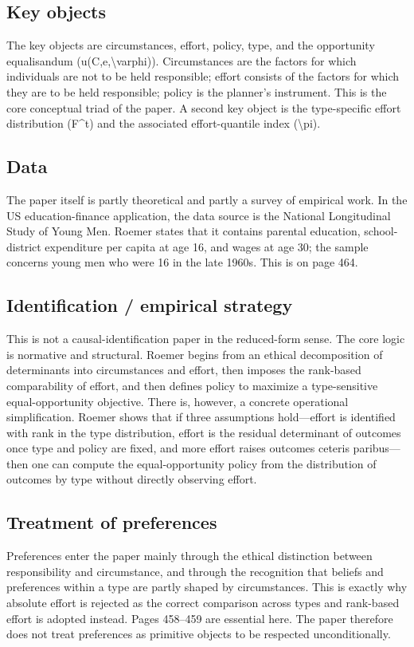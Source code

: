 \documentclass[11pt,a4paper]{article}
\begin{document}
\subsection*{Key objects}
The key objects are circumstances, effort, policy, type, and the opportunity equalisandum (u(C,e,\textbackslash{}varphi)). Circumstances are the factors for which individuals are not to be held responsible; effort consists of the factors for which they are to be held responsible; policy is the planner’s instrument. This is the core conceptual triad of the paper. A second key object is the type-specific effort distribution (F\textasciicircum{}t) and the associated effort-quantile index (\textbackslash{}pi).

\subsection*{Data}
The paper itself is partly theoretical and partly a survey of empirical work. In the US education-finance application, the data source is the National Longitudinal Study of Young Men. Roemer states that it contains parental education, school-district expenditure per capita at age 16, and wages at age 30; the sample concerns young men who were 16 in the late 1960s. This is on page 464.

\subsection*{Identification / empirical strategy}
This is not a causal-identification paper in the reduced-form sense. The core logic is normative and structural. Roemer begins from an ethical decomposition of determinants into circumstances and effort, then imposes the rank-based comparability of effort, and then defines policy to maximize a type-sensitive equal-opportunity objective. There is, however, a concrete operational simplification. Roemer shows that if three assumptions hold—effort is identified with rank in the type distribution, effort is the residual determinant of outcomes once type and policy are fixed, and more effort raises outcomes ceteris paribus—then one can compute the equal-opportunity policy from the distribution of outcomes by type without directly observing effort.

\subsection*{Treatment of preferences}
Preferences enter the paper mainly through the ethical distinction between responsibility and circumstance, and through the recognition that beliefs and preferences within a type are partly shaped by circumstances. This is exactly why absolute effort is rejected as the correct comparison across types and rank-based effort is adopted instead. Pages 458–459 are essential here. The paper therefore does not treat preferences as primitive objects to be respected unconditionally.
\end{document}
